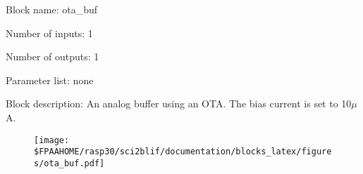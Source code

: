 \pagebreak

Block name: ota\_buf

Number of inputs: 1

Number of outputs: 1

Parameter list: none

Block description: 
An analog buffer using an OTA. The bias current is set to 10$\mu$A.

\begin{figure}[H]  %
\texttt{[image: \$FPAAHOME/rasp30/sci2blif/documentation/blocks\_latex/figures/ota\_buf.pdf]}
\end{figure}

